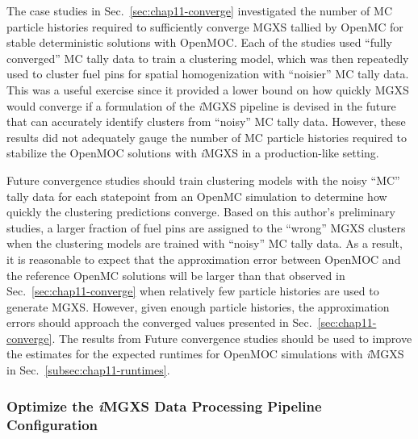 The case studies in Sec.~\ref{sec:chap11-converge} investigated the number of \ac{MC} particle histories required to sufficiently converge \ac{MGXS} tallied by OpenMC for stable deterministic solutions with OpenMOC. Each of the studies used ``fully converged'' \ac{MC} tally data to train a clustering model, which was then repeatedly used to cluster fuel pins for spatial homogenization with ``noisier'' \ac{MC} tally data. This was a useful exercise since it provided a lower bound on how quickly \ac{MGXS} would converge if a formulation of the \textit{i}\ac{MGXS} pipeline is devised in the future that can accurately identify clusters from ``noisy'' \ac{MC} tally data. However, these results did not adequately gauge the number of \ac{MC} particle histories required to stabilize the OpenMOC solutions with \textit{i}\ac{MGXS} in a production-like setting.

Future convergence studies should train clustering models with the noisy ``MC'' tally data for each statepoint from an OpenMC simulation to determine how quickly the clustering predictions converge. Based on this author's preliminary studies, a larger fraction of fuel pins are assigned to the ``wrong'' \ac{MGXS} clusters when the clustering models are trained with ``noisy'' \ac{MC} tally data. As a result, it is reasonable to expect that the approximation error between OpenMOC and the reference OpenMC solutions will be larger than that observed in Sec.~\ref{sec:chap11-converge} when relatively few particle histories are used to generate \ac{MGXS}. However, given enough particle histories, the approximation errors should approach the converged values presented in Sec.~\ref{sec:chap11-converge}. The results from Future convergence studies should be used to improve the estimates for the expected runtimes for OpenMOC simulations with \textit{i}\ac{MGXS} in Sec.~\ref{subsec:chap11-runtimes}.


\subsubsection{Optimize the \textit{i}MGXS Data Processing Pipeline Configuration}
\label{subsubsec:chap12-optimize-imgxs}

